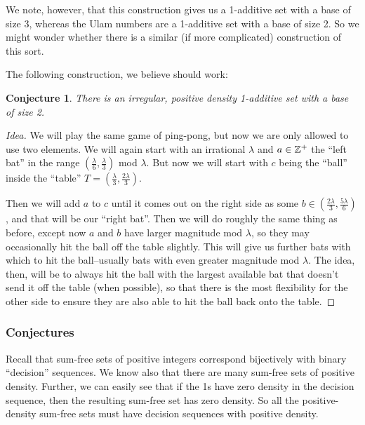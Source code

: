 \documentclass{article}
\newtheorem{conjecture}[theorem]{Conjecture}
\theoremstyle{definition}
\theoremstyle{remark}
\numberwithin{equation}{section}
\begin{document}
We note, however, that this construction gives us a 1-additive set
with a base of size 3, whereas the Ulam numbers are a 1-additive set
with a base of size 2.  So we might wonder whether there is a similar
(if more complicated) construction of this sort.

The following construction, we believe should work: 

\begin{conjecture}
  There is an irregular, positive density 1-additive set with a base
  of size 2.
\end{conjecture}

\begin{proof}[Idea]
  We will play the same game of ping-pong, but now we are only allowed
  to use two elements.  We will again start with an irrational
  $\lambda$ and $a \in \mathbb{Z}^+$ the ``left bat'' in the range
  $(\frac{\lambda}{6}, \frac{\lambda}{3})$ mod $\lambda$.  But now we
  will start with $c$ being the ``ball'' inside the ``table''
  $T = (\frac{\lambda}{3}, \frac{2\lambda}{3})$.

  Then we will add $a$ to $c$ until it comes out on the right side as
  some $b \in (\frac{2\lambda}{3}, \frac{5\lambda}{6})$, and that will
  be our ``right bat''.  Then we will do roughly the same thing as
  before, except now $a$ and $b$ have larger magnitude mod $\lambda$,
  so they may occasionally hit the ball off the table slightly.  This
  will give us further bats with which to hit the ball--usually bats
  with even greater magnitude mod $\lambda$.  The idea, then, will be
  to always hit the ball with the largest available bat that doesn't
  send it off the table (when possible), so that there is the most
  flexibility for the other side to ensure they are also able to hit
  the ball back onto the table.  
\end{proof}

\subsubsection{Conjectures}

Recall that sum-free sets of positive integers correspond bijectively
with binary ``decision'' sequences.  We know also that there are many
sum-free sets of positive density.  Further, we can easily see that if
the 1s have zero density in the decision sequence, then the resulting
sum-free set has zero density.  So all the positive-density sum-free
sets must have decision sequences with positive density.  
\end{document}
